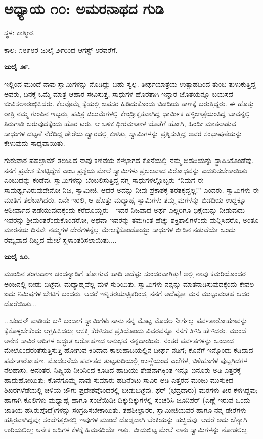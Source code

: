 
\chapter{ಅಧ್ಯಾಯ ೧೦: ಅಮರನಾಥದ ಗುಡಿ}

ಸ್ಥಳ: ಕಾಶ್ಮೀರ.

ಕಾಲ: ೧೮೯೮ರ ಜುಲೈ ೨೯ರಿಂದ ಆಗಸ್ಟ್ ೮ರವರೆಗೆ.

\textbf{ಜುಲೈ ೨೯.}

ಇಲ್ಲಿಂದ ಮುಂದೆ ನಾವು ಸ್ವಾಮಿಗಳನ್ನು ನೊಡಿದ್ದು ಬಹು ಸ್ವಲ್ಪ. ತೀರ್ಥಯಾತ್ರೆಯ ಉತ್ಸಾಹದಿಂದ ತುಂಬ ತುಳುಕುತ್ತಿದ್ದ ಅವರು, ದಿನಕ್ಕೆ ಒಮ್ಮೆ ಮಾತ್ರ ಆಹಾರ ಸೇವಿಸುತ್ತ, ಸಾಧುಗಳ ಹೊರತಾಗಿ ಇನ್ನಾರ ಜೊತೆಯನ್ನೂ ಬಯಸದೆ ಜೀವಿಸಲಾರಂಭಿಸಿದರು. ಕೆಲವೊಮ್ಮೆ ಕೈಯಲ್ಲಿ ಜಪಸರ ಹಿಡಿದುಕೊಂಡು ಬಿಡದಿಯ ತಾಣಕ್ಕೆ ಬರುತ್ತಿದ್ದರು. ಈ ಹೊತ್ತು ರಾತ್ರಿ ನಮ್ಮ ಗುಂಪಿನ ಇಬ್ಬರು, ಪವಿತ್ರ ಚಿಲುಮೆಗಳಲ್ಲಿ ಕೇಂದ್ರೀಕೃತವಾಗಿದ್ದ ಧಾರ್ಮಿಕ ಹಳ್ಳಿಜಾತ್ರೆಯಂತಿದ್ದ ಬಾವನ್ನಲ್ಲಿ ತಿರುಗಾಡಿ ಬರುವುದಕ್ಕೆಂದು ಹೊರ ಟರು. ಆ ಬಳಿಕ ಧೀರಮಾತಾಳ ಜೊತೆಗೆ ಹೋಗಿ, ಹಿಂದೀ ಮಾತನಾಡುವ ಸಾಧುಗಳ ದಟ್ಟಣೆ ನೆರೆದಿದ್ದ ಡೇರೆಯ ದ್ವಾರದಲ್ಲಿ ಕುಳಿತು, ಸ್ವಾಮಿಗಳನ್ನು ಪ್ರಶ್ನಿಸುತ್ತಿದ್ದ ಅವರ ಸಂಭಾಷಣೆಯನ್ನು ಕೇಳುವುದು ಸಾಧ್ಯವಾಯಿತು.

ಗುರುವಾರ ಪಹಲ್ಗಾಮ್​ ತಲುಪಿದ ನಾವು ಕಣಿವೆಯ ಕೆಳಭಾಗದ ಕೊನೆಯಲ್ಲಿ ನಮ್ಮ ಬಿಡದಿಯನ್ನು ಸ್ಥಾಪಿಸಿಕೊಂಡೆವು. ನನಗೆ ಪ್ರವೇಶ ಕೊಟ್ಟಿದ್ದೇಕೆ ಎಂಬ ಪ್ರಶ್ನೆಯ ಮೇಲೆ ಸ್ವಾಮಿಗಳು ಪ್ರಬಲವಾದ ವಿರೋಧವನ್ನು ಎದುರಿಸಬೇಕಾಯಿತು ಎಂಬುದನ್ನು ಕಂಡೆವು. ಸ್ವಾಮಿಗಳನ್ನು ಬೆಂಬಲಿಸುತ್ತಿದ್ದ ನಗ್ನ ಸಾಧುಗಳಲ್ಲೊಬ್ಬರು “ನಿಮಗೆ ಈ ಸಾಮರ್ಥ್ಯವಿರುವುದೇನೋ ನಿಜ, ಸ್ವಾಮೀಜಿ, ಆದರೆ ಅದನ್ನು ನೀವು ಪ್ರಕಾಶಕ್ಕೆ ತರತಕ್ಕದ್ದಲ್ಲ!” ಎಂದರು. ಸ್ವಾಮಿಗಳು ಈ ಮಾತಿಗೆ ತಲೆಬಾಗಿದರು. ಏನೇ ಇರಲಿ, ಆ ಹೊತ್ತು ಮಧ್ಯಾಹ್ನ ಸ್ವಾಮಿಗಳು ತಮ್ಮ ಮಗಳನ್ನು ಬಿಡದಿಯ ಉದ್ದಕ್ಕೂ ಆಶೀರ್ವಾದ ಪಡೆಯುವುದಕ್ಕೆಂದು ಕರೆದೊಯ್ದರು - ಇದರ ನಿಜವಾದ ಅರ್ಥ ಎಲ್ಲರಿಗೂ ಭಿಕ್ಷೆಯನ್ನು ನೀಡುವುದು - ಇವರನ್ನು ಶ‍್ರೀಮಂತರೆಂದುಕೊಂಡರೋ, ಅಥವಾ ಇವರನ್ನು ತಮಗಿಂತ ಹೆಚ್ಚು ಶಕ್ತಿಶಾಲಿಗಳೆಂದು ಮನ್ನಿಸಿದರೊ, ಅಂತೂ ಮಾರನೆಯ ದಿನವೇ ನಮ್ಮಗಳ ಡೇರೆಗಳನ್ನೆಲ್ಲ ಮೇಲಕ್ಕೆಕೊಂಡೊಯ್ದು ಸಾಧುಗಳ ಬೀಡಿನ ನಡುವೆಯೇ ಒಂದು ರಮ್ಯವಾದ ದಿಬ್ಬದ ಮೇಲೆ ಸ್ಥಳಾಂತರಿಸಲಾಯಿತು....

\textbf{ಜುಲೈ ೩೦.}

ಮುಂದಿನ ತಂಗುದಾಣ ಚಂದನ್ವಾಡಿಗೆ ಹೋಗುವ ಹಾದಿ ಅದೆಷ್ಟು ಸುಂದರವಾಗಿತ್ತು! ಅಲ್ಲಿ ನಾವು ಕಮರಿಯೊಂದರ ಅಂಚಿನಲ್ಲಿ ಬೀಡು ಬಿಟ್ಟೆವು. ಮಧ್ಯಾಹ್ನವೆಲ್ಲ ಮಳೆ ಸುರಿಯಿತು. ಸ್ವಾಮಿಗಳು ನನ್ನನ್ನು ಮಾತನಾಡಿಸುವುದಕ್ಕೆಂದು ಕೇವಲ ಐದು ನಿಮಿಷಗಳ ಭೇಟಿಗೆ ಬಂದರು. ಆದರೆ ಇನ್ನಿತರಯಾತ್ರಿಕರಿಂದ, ನನಗೆ ಅದೆಷ್ಟೋ ಮನ ಮುಟ್ಟುವಂತಹ ಆದರ ದೊರೆಯಿತು...

...ಚಂದನ್ ವಾಡಿಯ ಬಳಿ ಬಂದಾಗ ಸ್ವಾಮಿಗಳು ನಾನು ನನ್ನ ಮೊಟ್ಟ ಮೊದಲ ನೀರ್ಗಲ್ಲ ಪರ್ವತಾರೋಹಣವನ್ನು ಕೈಕೊಳ್ಳಬೇಕೆಂದು ಆಗ್ರಹಿಸಿದರು; ಆಸಕ್ತಿ ಕೆರಳಿಸುವ ಪ್ರತಿಯೊಂದು ವಿವರವನ್ನೂ ನನಗೆ ತಿಳಿಸಿ ಹೇಳಿದರು. ಮುಂದೆ ಅನೇಕ ಸಾವಿರ ಅಡಿಗಳ ಅದ್ಭುತ ಆರೋಹಣದ ಅನುಭವ ನನ್ನದಾಯಿತು. ನಂತರ ಪರ್ವತಗಳನ್ನು ಒಂದಾದ ಮೇಲೊಂದರಂತೆಸುತ್ತಿಸುತ್ತಿ ಹೋಗುವ ಕಿರಿದಾದ ಕಾಲುಹಾದಿಯಲ್ಲಿನ ದೀರ್ಘ ನಡಿಗೆ; ಕೊನೆಗೆ ಇನ್ನೊಂದು ಕಡಿದಾದ ಪರ್ವತಾರೋಹಣ. ಮೊದಲನೆಯ ಪರ್ವತದ ತುಟ್ಟತುದಿಯಲ್ಲಿ ಉಣ್ಣೆಯಂಥ ಎಲೆಗಳ, ಬಿಳಿಹೂಗಳ ಪುಟ್ಟಗಿಡಗಳ ನೆಲಹಾಸು. ಅನಂತರ, ನಿಷ್ಕ್ರಿಯ ನೀರಿನಿಂದ ಕೂಡಿದ ಹಾದಿಯು ಶೇಷನಾಗಕ್ಕಿಂತ ಇನ್ನೂ ಐನೂರು ಅಡಿ ಎತ್ತರಕ್ಕೆ ಹಾದುಹೋಯಿತು; ಕೊನೆಗೊಮ್ಮೆ ನಾವು ಸುಮಾರು ಹದಿನೆಂಟು ಸಾವಿರ ಅಡಿ ಎತ್ತರದ ಮಂಜು ಮುಸುಕಿದ ಶಿಖರಗಳೆಡೆಯಲ್ಲಿ ಚಳಿಯ ಜೌಗು ಪ್ರದೇಶವೊಂದರಲ್ಲಿ ಬೀಡುಬಿಟ್ಟೆವು. ಫರ್ (ಭದ್ರದಾರು) ಮರಗಳು ತೀರ ಕೆಳಗಿದ್ದವು; ಹಾಗಾಗಿ ಕೂಲಿಗಳು ಮಧ್ಯಾಹ್ನ ಹಾಗೂ ಸಂಜೆಯಿಡೀ ದಿಕ್ಕುದಿಕ್ಕುಗಳಲ್ಲಿ ಸಂಚರಿಸಿ ಜೂನಿಪರ್ (ಎಣ್ಣೆ ಇರುವ ಒಂದು ಜಾತಿಯ ಹಸಿರುಪೊದೆ)ಗಳನ್ನು ಸಂಗ್ರಹಿಸಬೇಕಾಯಿತು. ತಹಶೀಲ್ದಾರರ, ಸ್ವಾಮೀಜಿಯವರ ಹಾಗೂ ನನ್ನ ಡೇರೆಗಳು ಹತ್ತಿರವಾಗಿದ್ದವು; ಸಂಜೆಗತ್ತಲಿನಲ್ಲಿ ಇವುಗಳ ಮುಂದೆ ದೊಡ್ಡದಾಗಿ ಬೆಂಕಿಯನ್ನು ಹಚ್ಚಿದೆವು. ಆದರೆ ಅದು ಚೆನ್ನಾಗಿ ಉರಿಯಲಿಲ್ಲ; ಅನೇಕ ಅಡಿಗಳ ಕೆಳಕ್ಕೆ ಹಿಮನದಿಯೇ ಇತ್ತು. ಬೀಡುಬಿಟ್ಟ ಮೇಲೆ ನಾನು ಸ್ವಾಮಿಗಳನ್ನು ನೋಡಲಿಲ್ಲ.

